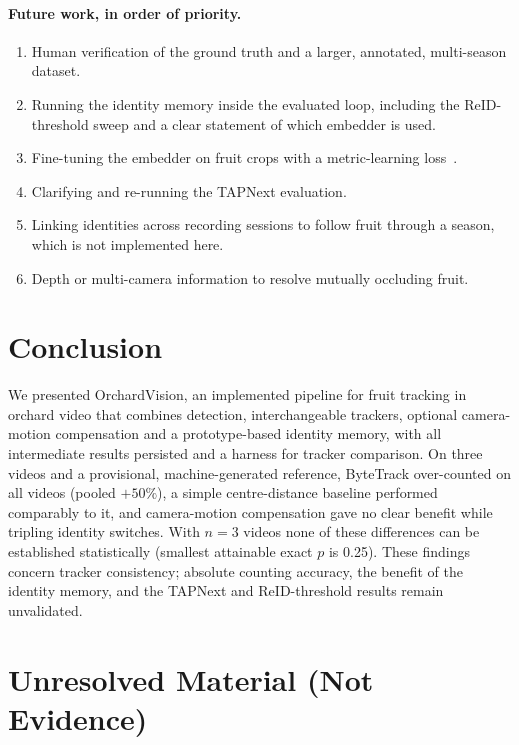 \documentclass[11pt,a4paper]{article}
\begin{document}
\paragraph{Future work, in order of priority.}
\begin{enumerate}[label=(\roman*)]
\item Human verification of the ground truth and a larger, annotated, multi-season dataset.
\item Running the identity memory inside the evaluated loop, including the ReID-threshold sweep and a clear statement of which embedder is used.
\item Fine-tuning the embedder on fruit crops with a metric-learning loss~\cite{hermans2017triplet,oord2018cpc}.
\item Clarifying and re-running the TAPNext evaluation.
\item Linking identities across recording sessions to follow fruit through a season, which is not implemented here.
\item Depth or multi-camera information to resolve mutually occluding fruit.
\end{enumerate}

\section{Conclusion}\label{sec:conclusion}
We presented OrchardVision, an implemented pipeline for fruit tracking in orchard video that combines detection, interchangeable trackers, optional camera-motion compensation and a prototype-based identity memory, with all intermediate results persisted and a harness for tracker comparison. On three videos and a provisional, machine-generated reference, ByteTrack over-counted on all videos (pooled $+50\%$), a simple centre-distance baseline performed comparably to it, and camera-motion compensation gave no clear benefit while tripling identity switches. With $n=3$ videos none of these differences can be established statistically (smallest attainable exact $p$ is 0.25). These findings concern tracker consistency; absolute counting accuracy, the benefit of the identity memory, and the TAPNext and ReID-threshold results remain unvalidated.

\appendix
\section{Unresolved Material (Not Evidence)}\label{app:unresolved}
\end{document}

